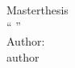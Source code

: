 \begin{titlepage}
\thispagestyle{empty}
\begin{center}
    Masterthesis\\[0.5in]
    {\Huge\enquote{ \GRYTTitle }}\\[2in]
    
    Author:\\author\\

\end{center}
\end{titlepage}
